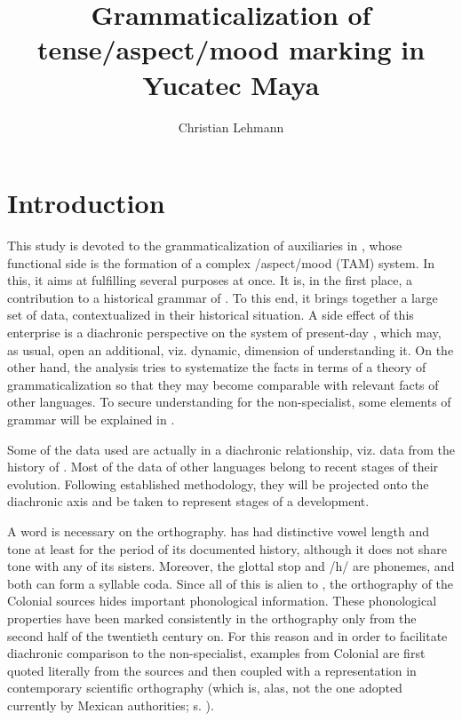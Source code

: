 \documentclass[output=paper]{langsci/langscibook}
\title{Grammaticalization of tense\slash aspect\slash\newlineCover mood marking in Yucatec Maya}
\author{%
 Christian Lehmann\affiliation{University of Erfurt}
}
\begin{document}

\section{Introduction}\label{sec:lehmann:1}
This study is devoted to the grammaticalization of auxiliaries in  , whose functional side is the formation of a complex \slash aspect\slash mood (TAM) system. In this, it aims at fulfilling several purposes at once. It is, in the first place, a contribution to a historical grammar of  . To this end, it brings together a large set of data, contextualized in their historical situation. A side effect of this enterprise is a diachronic perspective on the system of present-day  , which may, as usual, open an additional, viz. dynamic, dimension of understanding it. On the other hand, the analysis tries to systematize the facts in terms of a theory of grammaticalization so that they may become comparable with relevant facts of other languages. To secure understanding for the non-specialist, some elements of  grammar will be explained in .



Some of the data used are actually in a diachronic relationship, viz. data from the history of  . Most of the data of other  languages belong to recent stages of their evolution. Following established methodology, they will be projected onto the diachronic axis and be taken to represent stages of a development.



A word is necessary on the orthography.   has had distinctive vowel length and tone at least for the period of its documented history, although it does not share tone with any of its sisters. Moreover, the glottal stop and /h/ are phonemes, and both can form a syllable coda. Since all of this is alien to , the orthography of the Colonial   %
sources hides important phonological information. These phonological properties have been marked consistently in the orthography only from the second half of the twentieth century on. For this reason and in order to facilitate diachronic comparison to the non-specialist, examples from Colonial   are first quoted literally from the sources and then coupled with a representation in contemporary scientific orthography (which is, alas, not the one adopted currently by Mexican authorities; s. \citealt{Lehmann2015}). %
\end{document}
